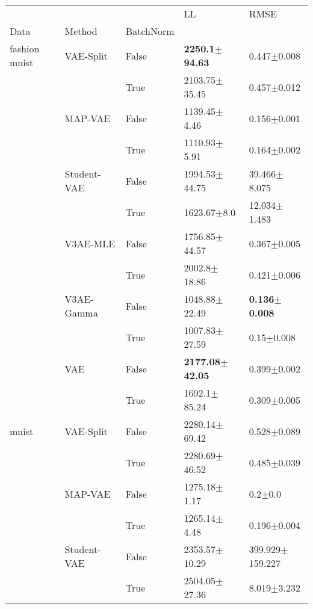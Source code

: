 \begin{tabular}{lllll}
\toprule
             &     &       &                          LL &                      RMSE \\
Data & Method & BatchNorm &                             &                           \\
\midrule
fashion mnist & VAE-Split & False &   \textbf{2250.1$\pm$94.63} &           0.447$\pm$0.008 \\
             &     & True  &           2103.75$\pm$35.45 &           0.457$\pm$0.012 \\
             & MAP-VAE & False &            1139.45$\pm$4.46 &           0.156$\pm$0.001 \\
             &     & True  &            1110.93$\pm$5.91 &           0.164$\pm$0.002 \\
             & Student-VAE & False &           1994.53$\pm$44.75 &          39.466$\pm$8.075 \\
             &     & True  &             1623.67$\pm$8.0 &          12.034$\pm$1.483 \\
             & V3AE-MLE & False &           1756.85$\pm$44.57 &           0.367$\pm$0.005 \\
             &     & True  &            2002.8$\pm$18.86 &           0.421$\pm$0.006 \\
             & V3AE-Gamma & False &           1048.88$\pm$22.49 &  \textbf{0.136$\pm$0.008} \\
             &     & True  &           1007.83$\pm$27.59 &            0.15$\pm$0.008 \\
             & VAE & False &  \textbf{2177.08$\pm$42.05} &           0.399$\pm$0.002 \\
             &     & True  &            1692.1$\pm$85.24 &           0.309$\pm$0.005 \\
mnist & VAE-Split & False &           2280.14$\pm$69.42 &           0.528$\pm$0.089 \\
             &     & True  &           2280.69$\pm$46.52 &           0.485$\pm$0.039 \\
             & MAP-VAE & False &            1275.18$\pm$1.17 &               0.2$\pm$0.0 \\
             &     & True  &            1265.14$\pm$4.48 &           0.196$\pm$0.004 \\
             & Student-VAE & False &           2353.57$\pm$10.29 &       399.929$\pm$159.227 \\
             &     & True  &           2504.05$\pm$27.36 &           8.019$\pm$3.232 \\

\end{tabular}
